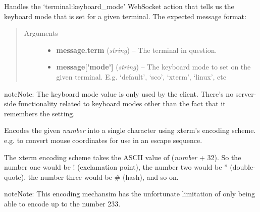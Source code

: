 \documentclass[letterpaper,10pt,openany]{sphinxmanual}
\begin{document}

\begin{fulllineitems}
\label{Applications/terminal/js_terminal:GateOne.Terminal.termKeyboardModeAction}
Handles the `terminal:keyboard\_mode' WebSocket action that tells us the keyboard mode that is set for a given terminal.  The expected message format:
\begin{quote}\begin{description}
\item[{Arguments}] \leavevmode\begin{itemize}
\item {} 
\textbf{message.term} (\emph{string}) -- The terminal in question.

\item {} 
\textbf{message{[}'mode'{]}} (\emph{string}) -- The keyboard mode to set on the given terminal.  E.g. `default', `sco', `xterm', `linux', etc

\end{itemize}

\end{description}\end{quote}

\begin{notice}{note}{Note:}
The keyboard mode value is only used by the client.  There's no server-side functionality related to keyboard modes other than the fact that it remembers the setting.
\end{notice}

\end{fulllineitems}


\begin{fulllineitems}
\label{Applications/terminal/js_terminal:GateOne.Terminal.xtermEncode}
Encodes the given \emph{number} into a single character using xterm's encoding scheme.  e.g. to convert mouse coordinates for use in an escape sequence.

The xterm encoding scheme takes the ASCII value of (\emph{number} + 32).  So the number one would be ! (exclamation point), the number two would be '' (double-quote), the number three would be \# (hash), and so on.

\begin{notice}{note}{Note:}
This encoding mechansim has the unfortunate limitation of only being able to encode up to the number 233.
\end{notice}

\end{fulllineitems}
\end{document}
